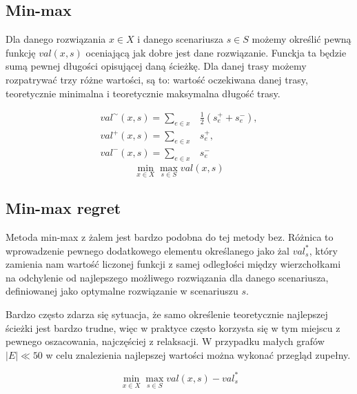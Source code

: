 \documentclass[10pt]{article}
\begin{document}
\subsection{Min-max}
Dla danego rozwiązania $x \in X$ i danego scenariusza $s \in S$ możemy określić pewną funkcję $val(x, s)$ oceniającą jak dobre jest dane rozwiązanie. Funckja ta będzie sumą pewnej długości opisującej daną ścieżkę. Dla danej trasy możemy rozpatrywać trzy różne wartości, są to: wartość oczekiwana danej trasy, teoretycznie minimalna i teoretycznie maksymalna długość trasy.

\begin{eqnarray}
  {val}^\sim(x, s) = \sum_{e \in x}& \frac{1}{2}\left(s_e^+ +  s_e^-\right), \\
  {val}^+(x, s) =    \sum_{e \in x}& s_e^+, \\
  {val}^-(x, s) =    \sum_{e \in x}& s_e^-
\end{eqnarray}
\begin{equation}
  \min_{x \in X} \max_{s \in S} val(x, s)
\end{equation}

\subsection{Min-max regret}
Metoda min-max z żalem jest bardzo podobna do tej metody bez. Różnica to wprowadzenie pewnego dodatkowego elementu określanego jako żal $val^*_s$, który zamienia nam wartość liczonej funkcji z samej odległości między wierzchołkami na odchylenie od najlepszego możliwego rozwiązania dla danego scenariusza, definiowanej jako optymalne rozwiązanie w scenariuszu $s$.

Bardzo często zdarza się sytuacja, że samo określenie teoretycznie najlepszej ścieżki jest bardzo trudne, więc w praktyce często korzysta się w tym miejscu z pewnego oszacowania, najczęściej z relaksacji. W przypadku małych grafów $|E| \ll 50$ w celu znalezienia najlepszej wartości można wykonać przegląd zupełny.

\begin{equation}
  \min_{x \in X} \max_{s \in S} val(x, s) - val^*_s
\end{equation}
\end{document}
